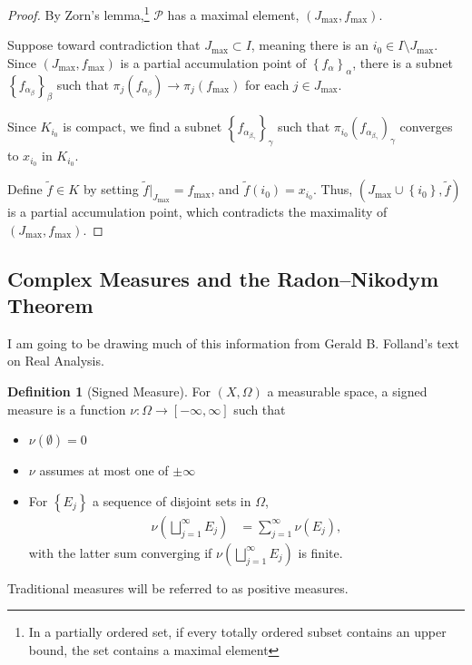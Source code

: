 \documentclass[12pt]{extarticle}
\newcommand{\set}[1]{\left\{#1\right\}}
\theoremstyle{plain}
\theoremstyle{definition}
\newtheorem*{definition}{Definition}
\theoremstyle{note}
\renewcommand{\newline}{\hfill\break}
\begin{document}
\begin{proof}
  By Zorn's lemma,\footnote{In a partially ordered set, if every totally ordered subset contains an upper bound, the set contains a maximal element} $\mathcal{P}$ has a maximal element, $\left(J_{\text{max}},f_{\text{max}}\right)$.\newline

  Suppose toward contradiction that $J_{\text{max}}\subset I$, meaning there is an $i_0\in I\setminus J_{\text{max}}$. Since $\left(J_{\text{max}},f_{\text{max}}\right)$ is a partial accumulation point of $\set{f_{\alpha}}_{\alpha}$, there is a subnet $\set{f_{\alpha_\beta}}_{\beta}$ such that $\pi_{j}\left(f_{\alpha_\beta}\right) \rightarrow \pi_{j}\left(f_{\text{max}}\right)$ for each $j\in J_{\text{max}}$.\newline

  Since $K_{i_0}$ is compact, we find a subnet $\set{f_{\alpha_{\beta_{\gamma}}}}_{\gamma}$ such that $\pi_{i_0}\left(f_{\alpha_{\beta_{\gamma}}}\right)_{\gamma}$ converges to $x_{i_0}$ in $K_{i_0}$.\newline

  Define $\tilde{f} \in K$ by setting $\tilde{f}\vert_{J_{\text{max}}} = f_{\text{max}}$, and $\tilde{f}(i_0) = x_{i_0}$. Thus, $\left(J_{\text{max}}\cup \set{i_0},\tilde{f}\right)$ is a partial accumulation point, which contradicts the maximality of $\left(J_{\text{max}},f_{\text{max}}\right)$.
\end{proof}
\subsection{Complex Measures and the Radon--Nikodym Theorem}%
I am going to be drawing much of this information from Gerald B. Folland's text on Real Analysis.
\begin{definition}[Signed Measure]
  For $(X,\Omega)$ a measurable space, a signed measure is a function $\nu: \Omega \rightarrow [-\infty,\infty]$ such that
  \begin{itemize}
    \item $\nu\left(\emptyset\right) = 0$
    \item $\nu$ assumes at most one of $\pm\infty$
    \item For $\set{E_j}$ a sequence of disjoint sets in $\Omega$,
      \begin{align*}
        \nu\left(\bigsqcup_{j=1}^{\infty}E_j\right) &= \sum_{j=1}^{\infty}\nu\left(E_j\right),
      \end{align*}
      with the latter sum converging if $\nu\left(\bigsqcup_{j=1}^{\infty}E_j\right)$ is finite.
  \end{itemize}
\end{definition}
Traditional measures will be referred to as positive measures.\newline
\end{document}

